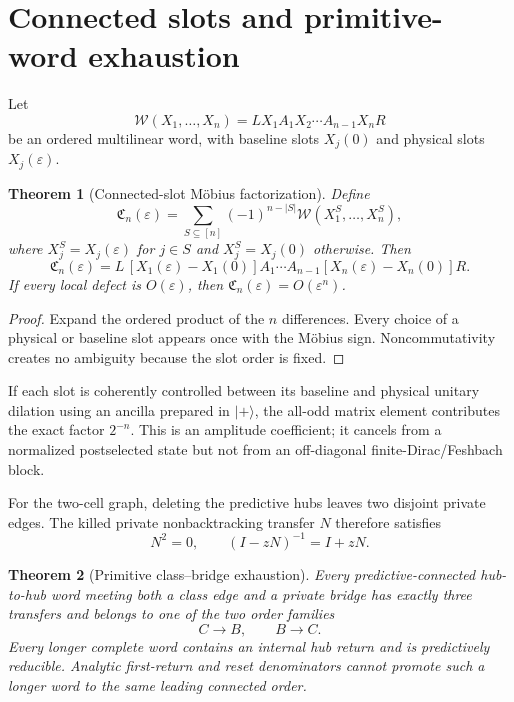 \documentclass[11pt,oneside,openany]{book}
\numberwithin{equation}{chapter}
\newtheorem{theorem}{Theorem}[chapter]
\theoremstyle{definition}
\theoremstyle{remark}
\begin{document}
\section{Connected slots and primitive-word exhaustion}

Let
\[
 \mathcal W(X_1,\ldots,X_n)
 =LX_1A_1X_2\cdots A_{n-1}X_nR
\]
be an ordered multilinear word, with baseline slots \(X_j(0)\) and physical
slots \(X_j(\varepsilon)\).

\begin{theorem}[Connected-slot M\"obius factorization]
\label{thm:connected-slot-factorization}
Define
\[
 \mathfrak C_n(\varepsilon)
 =
 \sum_{S\subseteq[n]}(-1)^{n-|S|}
 \mathcal W(X_1^S,\ldots,X_n^S),
\]
where \(X_j^S=X_j(\varepsilon)\) for \(j\in S\) and \(X_j^S=X_j(0)\)
otherwise.  Then
\[
 \boxed{
 \mathfrak C_n(\varepsilon)
 =
 L\,[X_1(\varepsilon)-X_1(0)]A_1\cdots
 A_{n-1}[X_n(\varepsilon)-X_n(0)]R.}
\]
If every local defect is \(O(\varepsilon)\), then
\(\mathfrak C_n(\varepsilon)=O(\varepsilon^n)\).
\end{theorem}

\begin{proof}
Expand the ordered product of the \(n\) differences.  Every choice of a
physical or baseline slot appears once with the M\"obius sign.
Noncommutativity creates no ambiguity because the slot order is fixed.
\end{proof}

If each slot is coherently controlled between its baseline and physical
unitary dilation using an ancilla prepared in \(|+\rangle\), the all-odd
matrix element contributes the exact factor \(2^{-n}\).  This is an
amplitude coefficient; it cancels from a normalized postselected state but
not from an off-diagonal finite-Dirac/Feshbach block.

For the two-cell graph, deleting the predictive hubs leaves two disjoint
private edges.  The killed private nonbacktracking transfer \(N\) therefore
satisfies
\[
 \boxed{N^2=0,\qquad (I-zN)^{-1}=I+zN.}
\]

\begin{theorem}[Primitive class--bridge exhaustion]
\label{thm:primitive-exhaustion}
Every predictive-connected hub-to-hub word meeting both a class edge and a
private bridge has exactly three transfers and belongs to one of the two
order families
\[
 C\to B,\qquad B\to C.
\]
Every longer complete word contains an internal hub return and is
predictively reducible.  Analytic first-return and reset denominators cannot
promote such a longer word to the same leading connected order.
\end{theorem}
\end{document}
